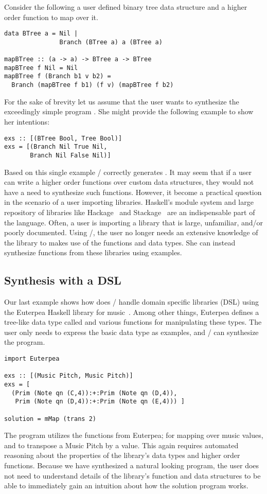 Consider the following a user defined binary tree data structure and a higher order function to map over it.
\begin{lstlisting}
data BTree a = Nil |
               Branch (BTree a) a (BTree a)

mapBTree :: (a -> a) -> BTree a -> BTree 
mapBTree f Nil = Nil
mapBTree f (Branch b1 v b2) = 
  Branch (mapBTree f b1) (f v) (mapBTree f b2)
\end{lstlisting}

For the sake of brevity let us assume that the user wants to synthesize
the exceedingly simple program .
She might provide the following example to show her intentions:
\begin{lstlisting}
exs :: [(BTree Bool, Tree Bool)]
exs = [(Branch Nil True Nil,
       Branch Nil False Nil)]
\end{lstlisting}
Based on this single example \ourTool/ correctly generates . It may seem that if a user can write a higher order functions over custom data structures, they would not have a need to synthesize such functions.
However, it become a practical question in the scenario of a user importing libraries.
Haskell's module system and large repository of libraries like Hackage~\cite{hackage} and Stackage~\cite{stackage} are an indispensable part of the language.
Often, a user is importing a library that is large, unfamiliar, and/or poorly documented.
Using \ourTool/, the user no longer needs an extensive knowledge of the library to makes use of the functions and data types. She can instead synthesize functions from these libraries using examples.


\subsection{Synthesis with a DSL}

Our last example shows how does \ourTool/ handle domain specific libraries (DSL) using the Euterpea Haskell library for music~\cite{euterpea}. 
Among other things, Euterpea defines a tree-like data type called  and various functions for manipulating these types.
The user only needs to express the basic data type as examples, and \ourTool/ can synthesize the  program.
\begin{lstlisting}
import Euterpea

exs :: [(Music Pitch, Music Pitch)]
exs = [
  (Prim (Note qn (C,4)):+:Prim (Note qn (D,4)),
   Prim (Note qn (D,4)):+:Prim (Note qn (E,4))) ]
        
solution = mMap (trans 2)
\end{lstlisting}
The  program utilizes the functions from Euterpea;  for mapping over music values, and  to transpose a Music Pitch by a value.
This again requires automated reasoning about the properties of the library's data types and higher order functions.
Because we have synthesized a natural looking program, the user does not need to understand details of the library's function and data structures to be able to immediately gain an intuition about how the solution program works.
